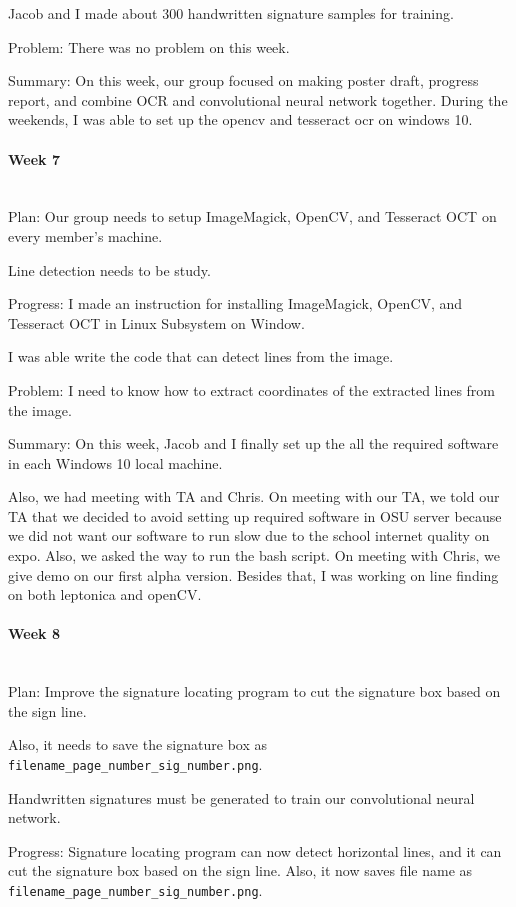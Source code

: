 \documentclass[article, onecolumn, draftclsnofoot,10pt, compsoc]{IEEEtran}
\begin{document}
Jacob and I made about 300 handwritten signature samples for training.
 
Problem: There was no problem on this week.

Summary: On this week, our group focused on making poster draft, progress report, and combine OCR and convolutional neural network together. During the weekends, I was able to set up the opencv and tesseract ocr on windows 10.

\paragraph{Week 7}
\mbox{}\\
Plan: Our group needs to setup ImageMagick, OpenCV, and Tesseract OCT on every member's machine.

Line detection needs to be study.
 
Progress: I made an instruction for installing ImageMagick, OpenCV, and Tesseract OCT in Linux Subsystem on Window.

I was able write the code that can detect lines from the image.
 
Problem: I need to know how to extract coordinates of the extracted lines from the image.

Summary: On this week, Jacob and I finally set up the all the required software in each Windows 10 local machine.

Also, we had meeting with TA and Chris. On meeting with our TA, we told our TA that we decided to avoid setting up required software in OSU server because we did not want our software to run slow due to the school internet quality on expo. Also, we asked the way to run the bash script. On meeting with Chris, we give demo on our first alpha version. Besides that, I was working on line finding on both leptonica and openCV.

\paragraph{Week 8}
\mbox{}\\
Plan: Improve the signature locating program to cut the signature box based on the sign line.

Also, it needs to save the signature box as \texttt{filename\_page\_number\_sig\_number.png}.

Handwritten signatures must be generated to train our convolutional neural network.
 
Progress: Signature locating program can now detect horizontal lines, and it can cut the signature box based on the sign line. Also, it now saves file name as \texttt{filename\_page\_number\_sig\_number.png}.
\end{document}
